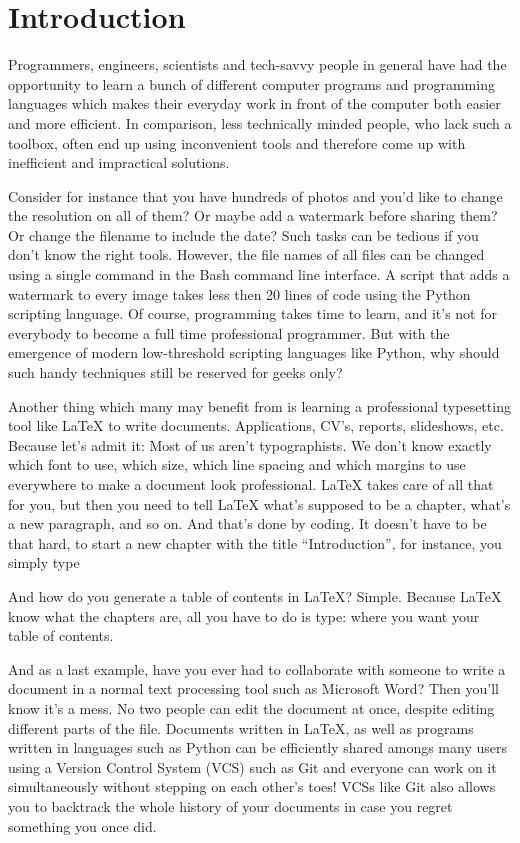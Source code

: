 \chapter{Introduction}
Programmers, engineers, scientists and tech-savvy people in general have had the opportunity to learn a bunch of different computer programs and programming languages which makes their everyday work in front of the computer both easier and more efficient. In comparison, less technically minded people, who lack such a toolbox, often end up using inconvenient tools and therefore come up with inefficient and impractical solutions.

Consider for instance that you have hundreds of photos and you’d like to change the resolution on all of them? Or maybe add a watermark before sharing them? Or change the filename to include the date? Such tasks can be tedious if you don’t know the right tools. However, the file names of all files can be changed using a single command in the Bash command line interface. A script that adds a watermark to every image takes less then 20 lines of code using the Python scripting language. Of course, programming takes time to learn, and it’s not for everybody to become a full time professional programmer. But with the emergence of modern low-threshold scripting languages like Python, why should such handy techniques still be reserved for geeks only?

Another thing which many may benefit from is learning a professional typesetting tool like LaTeX to write documents. Applications, CV’s, reports, slideshows, etc. Because let’s admit it: Most of us aren’t typographists. We don’t know exactly which font to use, which size, which line spacing and which margins to use everywhere to make a document look professional. LaTeX takes care of all that for you, but then you need to tell LaTeX what’s supposed to be a chapter, what’s a new paragraph, and so on. And that’s done by coding. It doesn’t have to be that hard, to start a new chapter with the title “Introduction”, for instance, you simply type 

And how do you generate a table of contents in LaTeX? Simple. Because LaTeX know what the chapters are, all you have to do is type:
\latexone{\tableofcontents}
where you want your table of contents.

And as a last example, have you ever had to collaborate with someone to write a document in a normal text processing tool such as Microsoft Word? Then you’ll know it’s a mess. No two people can edit the document at once, despite editing different parts of the file. Documents written in LaTeX, as well as programs written in languages such as Python can be efficiently shared amongs many users using a Version Control System (VCS) such as Git and everyone can work on it simultaneously without stepping on each other’s toes! VCSs like Git also allows you to backtrack the whole history of your documents in case you regret something you once did.

